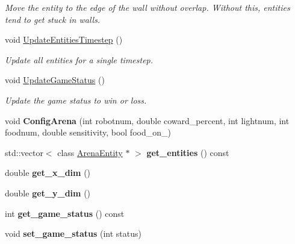 \begin{DoxyCompactItemize}
\begin{DoxyCompactList}\small\item\em Move the entity to the edge of the wall without overlap. Without this, entities tend to get stuck in walls. \end{DoxyCompactList}\item 
void \hyperlink{class_arena_a682ec81cb30e36e5bb801b3388bcb494}{Update\+Entities\+Timestep} ()
\begin{DoxyCompactList}\small\item\em Update all entities for a single timestep. \end{DoxyCompactList}\item 
void \hyperlink{class_arena_a700c436c43cd6c692b0e357dac94c507}{Update\+Game\+Status} ()
\begin{DoxyCompactList}\small\item\em Update the game status to win or loss. \end{DoxyCompactList}\item 
void {\bfseries Config\+Arena} (int robotnum, double coward\+\_\+percent, int lightnum, int foodnum, double sensitivity, bool food\+\_\+on\+\_\+)\hypertarget{class_arena_ad65f82d31e5d0fc7a859a809222fe53f}{}\label{class_arena_ad65f82d31e5d0fc7a859a809222fe53f}

\item 
std\+::vector$<$ class \hyperlink{class_arena_entity}{Arena\+Entity} $\ast$ $>$ {\bfseries get\+\_\+entities} () const \hypertarget{class_arena_aabb4ffe05aefc71ee10d47b191963fe5}{}\label{class_arena_aabb4ffe05aefc71ee10d47b191963fe5}

\item 
double {\bfseries get\+\_\+x\+\_\+dim} ()\hypertarget{class_arena_a5e3be20f2c67338a5a684b85a66f6b96}{}\label{class_arena_a5e3be20f2c67338a5a684b85a66f6b96}

\item 
double {\bfseries get\+\_\+y\+\_\+dim} ()\hypertarget{class_arena_a35737d65ff32f2bd5871f0bdfbc10a85}{}\label{class_arena_a35737d65ff32f2bd5871f0bdfbc10a85}

\item 
int {\bfseries get\+\_\+game\+\_\+status} () const \hypertarget{class_arena_a6d196837daa08a2618c3ff6e0a741b25}{}\label{class_arena_a6d196837daa08a2618c3ff6e0a741b25}

\item 
void {\bfseries set\+\_\+game\+\_\+status} (int status)\hypertarget{class_arena_ac8e8b3438db02aa5395f7fcb537ed952}{}\label{class_arena_ac8e8b3438db02aa5395f7fcb537ed952}

\end{DoxyCompactItemize}


